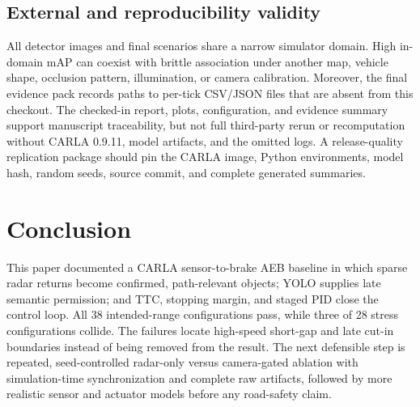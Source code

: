 \documentclass[conference]{IEEEtran}
\begin{document}
\subsection{External and reproducibility validity}
All detector images and final scenarios share a narrow simulator domain. High
in-domain mAP can coexist with brittle association under another map, vehicle
shape, occlusion pattern, illumination, or camera calibration. Moreover, the
final evidence pack records paths to per-tick CSV/JSON files that are absent from
this checkout. The checked-in report, plots, configuration, and evidence summary
support manuscript traceability, but not full third-party rerun or recomputation
without CARLA 0.9.11, model artifacts, and the omitted logs. A release-quality
replication package should pin the CARLA image, Python environments, model hash,
random seeds, source commit, and complete generated summaries.

\section{Conclusion}
This paper documented a CARLA sensor-to-brake AEB baseline in which sparse radar
returns become confirmed, path-relevant objects; YOLO supplies late semantic
permission; and TTC, stopping margin, and staged PID close the control loop. All
38 intended-range configurations pass, while three of 28 stress configurations
collide. The failures locate high-speed short-gap and late cut-in boundaries
instead of being removed from the result. The next defensible step is repeated,
seed-controlled radar-only versus camera-gated ablation with simulation-time
synchronization and complete raw artifacts, followed by more realistic sensor
and actuator models before any road-safety claim.

\balance


\end{document}
